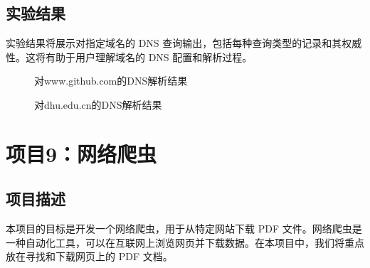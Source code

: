 \documentclass[UTF8,titlepage]{ctexart}
\numberwithin{figure}{section}
\begin{document}
\subsection{实验结果}
实验结果将展示对指定域名的 DNS 查询输出，包括每种查询类型的记录和其权威性。这将有助于用户理解域名的 DNS 配置和解析过程。
\begin{figure}[H]
\centering
 \caption{对www.github.com的DNS解析结果}
 \label{}
\end{figure}

\begin{figure}[H]
\centering
 \caption{对dhu.edu.cn的DNS解析结果}
 \label{}
\end{figure}

\clearpage

\section{项目9：网络爬虫}

\subsection{项目描述}
本项目的目标是开发一个网络爬虫，用于从特定网站下载 PDF 文件。网络爬虫是一种自动化工具，可以在互联网上浏览网页并下载数据。在本项目中，我们将重点放在寻找和下载网页上的 PDF 文档。
\end{document}

